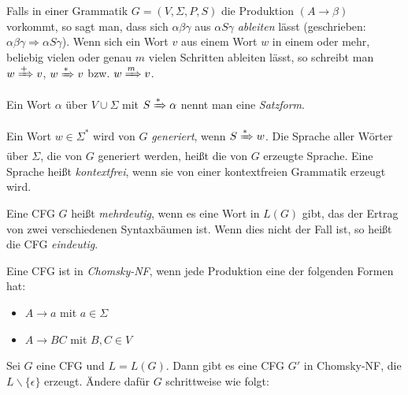 \documentclass{cheat-sheet}
\begin{document}
\begin{defn}
Falls in einer Grammatik $G = (V, \Sigma, P, S)$ die Produktion $(A \longrightarrow \beta)$ vorkommt, so sagt man, dass sich $\alpha \beta \gamma$ aus $\alpha S \gamma$ \emph{ableiten} lässt (geschrieben: $\alpha \beta \gamma \Rightarrow \alpha S \gamma $). Wenn sich ein Wort $v$ aus einem Wort $w$ in einem oder mehr, beliebig vielen oder genau $m$ vielen Schritten ableiten lässt, so schreibt man $w \xRightarrow{+} v$, $w \xRightarrow{*} v$ bzw. $w \xRightarrow{m} v$.
\end{defn}

\begin{defn}
Ein Wort $\alpha$ über $V \cup \Sigma$ mit $S \xRightarrow{*} \alpha$ nennt man eine \emph{Satzform}.
\end{defn}

\begin{defn}
Ein Wort $w \in \Sigma^{*}$ wird von $G$ \emph{generiert}, wenn $S \xRightarrow[]{*} w$. Die Sprache aller Wörter über $\Sigma$, die von $G$ generiert werden, heißt die von $G$ erzeugte Sprache. Eine Sprache heißt \emph{kontextfrei}, wenn sie von einer kontextfreien Grammatik erzeugt wird.
\end{defn}


\begin{defn}
  Eine CFG $G$ heißt \emph{mehrdeutig}, wenn es eine Wort in $L(G)$ gibt, das der Ertrag von zwei verschiedenen Syntaxbäumen ist. Wenn dies nicht der Fall ist, so heißt die CFG \emph{eindeutig}.
\end{defn}

\fbox{
  \begin{minipage}{8.5cm}
    \hfill\vspace{2.5cm}
  \end{minipage}
}

\begin{defn}
  Eine CFG ist in \emph{Chomsky-NF}, wenn jede Produktion eine der folgenden Formen hat:
  \begin{itemize}
    \item $A \longrightarrow a$ mit $a \in \Sigma$
    \item $A \longrightarrow BC$ mit $B, C \in V$
  \end{itemize}
\end{defn}

\begin{alg}
Sei $G$ eine CFG und $L = L(G)$. Dann gibt es eine CFG $G'$ in Chomsky-NF, die $L \backslash \{ \epsilon \}$ erzeugt. Ändere dafür $G$ schrittweise wie folgt:
\end{alg}
\end{document}
